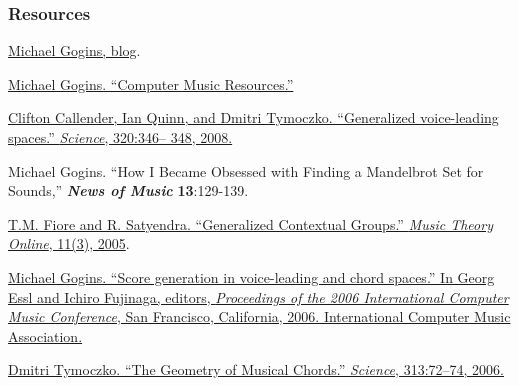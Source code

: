\documentclass{beamer}
\begin{document}
\begin{frame}[allowframebreaks]
  \frametitle<presentation>{Resources}
    
  \begin{thebibliography}{10}
    
  \beamertemplatebookbibitems

   \href{http://michaelgogins.tumblr.com}{Michael Gogins, blog}.
  
   \href{https://github.com/gogins/gogins.github.io}{Michael Gogins. ``Computer Music Resources.''}

   \href{http://www.sciencemag.org/content/320/5874/346.abstract}{Clifton Callender, Ian Quinn, and Dmitri Tymoczko. ``Generalized voice-leading spaces.'' \emph{Science}, 320:346–
348, 2008.}

   {Michael Gogins. ``How I Became Obsessed with Finding a Mandelbrot Set for Sounds,'' \textbf{\textit{News of Music}} \textbf{13}:129-139.}

   \href{http://www.mtosmt.org/issues/mto.05.11.3/mto.05.11.3.fiore_satyendra.pdf}{T.M. Fiore and R. Satyendra. ``Generalized Contextual
Groups.'' \emph{Music Theory Online}, 11(3), 2005}.

    \href{https://www.dropbox.com/s/ztej71n2fbn4tq4/Lindenmayer_Systems_Based_on_Riemannian_Transformations.pdf}{Michael Gogins. ``Score generation in voice-leading
and chord spaces.'' In Georg Essl and Ichiro Fujinaga,
editors, \emph{Proceedings of the 2006 International Computer Music Conference}, San Francisco, California,
2006. International Computer Music Association.}

   \href{http://www.sciencemag.org/content/313/5783/72.abstract?ijkey=wzKBea3ktKdu2&keytype=ref&siteid=sci}{Dmitri Tymoczko. ``The Geometry of Musical Chords.'' \emph{Science}, 313:72–74, 2006.}

  \end{thebibliography}

\end{frame}
\end{document}
